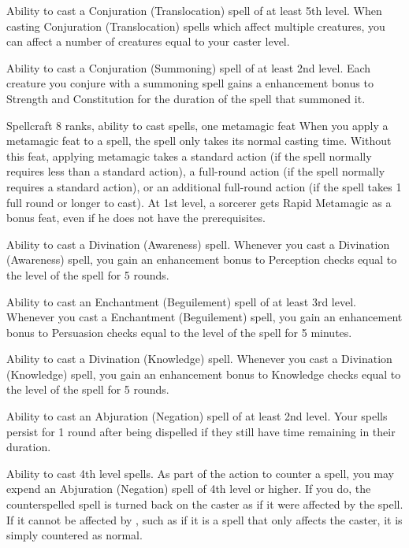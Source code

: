 \featpre Ability to cast a Conjuration (Translocation) spell of at least 5th level.
\featben When casting Conjuration (Translocation) spells which affect multiple creatures, you can affect a number of creatures equal to your caster level.

 Ability to cast a Conjuration (Summoning) spell of at least 2nd level.
 Each creature you conjure with a summoning spell gains a  enhancement bonus to Strength and Constitution for the duration of the spell that summoned it.

 Spellcraft 8 ranks, ability to cast spells, one metamagic feat
 When you apply a metamagic feat to a spell, the spell only takes its normal casting time.
 Without this feat, applying metamagic takes a standard action (if the spell normally requires less than a standard action), a full-round action (if the spell normally requires a standard action), or an additional full-round action (if the spell takes 1 full round or longer to cast).
 At 1st level, a sorcerer gets Rapid Metamagic as a bonus feat, even if he does not have the prerequisites.

\featpre Ability to cast a Divination (Awareness) spell.
\featben Whenever you cast a Divination (Awareness) spell, you gain an enhancement bonus to Perception checks equal to the level of the spell for 5 rounds.

\featpre Ability to cast an Enchantment (Beguilement) spell of at least 3rd level.
\featben Whenever you cast a Enchantment (Beguilement) spell, you gain an enhancement bonus to Persuasion checks equal to the level of the spell for 5 minutes.

\featpre Ability to cast a Divination (Knowledge) spell.
\featben Whenever you cast a Divination (Knowledge) spell, you gain an enhancement bonus to Knowledge checks equal to the level of the spell for 5 rounds.

\featpre Ability to cast an Abjuration (Negation) spell of at least 2nd level.
\featben Your spells persist for 1 round after being dispelled if they still have time remaining in their duration.

 Ability to cast 4th level spells.
 As part of the action to counter a spell, you may expend an Abjuration (Negation) spell of 4th level or higher. If you do, the counterspelled spell is turned back on the caster as if it were affected by the  spell. If it cannot be affected by , such as if it is a spell that only affects the caster, it is simply countered as normal.

